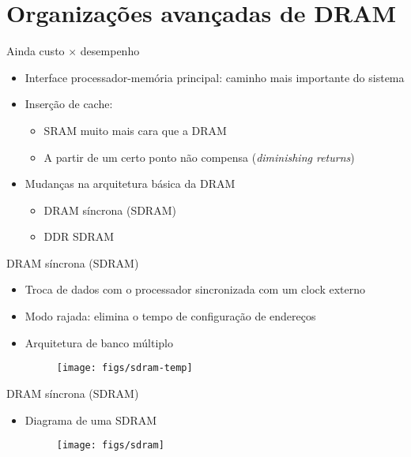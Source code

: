 \section[slide=true]{Organizações avançadas de DRAM}
\begin{slide}{Ainda custo $\times$ desempenho}
   \begin{itemize}
      \item Interface processador-memória principal: caminho mais importante do sistema
      \item Inserção de cache: 
	      \begin{itemize}
		      \item SRAM muito mais cara que a DRAM
		      \item A partir de um certo ponto não compensa (\emph{diminishing returns})
	      \end{itemize}
      \item Mudanças na arquitetura básica da DRAM 
	      \begin{itemize}
		      \item DRAM síncrona (SDRAM)
		      \item DDR SDRAM
	      \end{itemize}
   \end{itemize}
\end{slide}
 
 \begin{slide}{DRAM síncrona (SDRAM)}
 \begin{itemize}
    \item Troca de dados com o processador sincronizada com um clock externo
    \item Modo rajada: elimina o tempo de configuração de endereços
    \item Arquitetura de banco múltiplo
    \begin{figure}[h]
       \centering
       \texttt{[image: figs/sdram-temp]}
    \end{figure}
 \end{itemize}
 \end{slide}
 
 \begin{slide}{DRAM síncrona (SDRAM)}
 \begin{itemize}
    \item Diagrama de uma SDRAM
    \begin{figure}[h]
       \centering
       \texttt{[image: figs/sdram]}
    \end{figure}
 \end{itemize}
 \end{slide}

